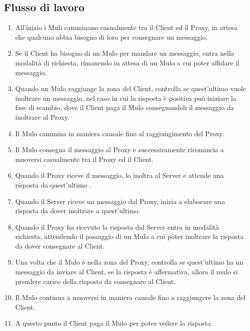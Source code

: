\documentclass[13pt,a4paper]{article}
\begin{document}
\subsection{Flusso di lavoro}
	\begin{enumerate}
	\item All'inizio i Muli camminano casualmente tra il Client ed il Proxy, in attesa che qualcuno abbia bisogno di loro per consegnare un messaggio.
	
	\item Se il Client ha bisogno di un Mulo per mandare un messaggio, entra nella modalità di richiesta, rimanendo in attesa di un Mulo a cui poter affidare il messaggio.
	
	\item Quando un Mulo raggiunge la zona del Client, controlla se quest'ultimo vuole inoltrare un messaggio, nel caso in cui la risposta è positiva può iniziare la fase di scambio, dove il Client paga il Mulo consegnandoli il messaggio da inoltrare al Proxy.
	
	\item Il Mulo cammina in maniera causale fino al raggiungimento del Proxy.
	
	\item Il Mulo consegna il messaggio al Proxy e successivamente ricomincia a muoversi casualmente tra il Proxy ed il Client.
	
	\item Quando il Proxy riceve il messaggio, lo inoltra al Server e attende una risposta da quest'ultimo .
	
	\item Quando il Server riceve un messaggio dal Proxy, inizia a elaborare una risposta da dover inoltrare a quest'ultimo.
	
	\item Quando il Proxy ha ricevuto la risposta dal Server entra in modalità richiesta, attendendo il passaggio  di un Mulo a cui poter inoltrare la risposta da dover consegnare al Client. 
	
	\item Una volta che il Mulo è nella zona del Proxy, controlla se quest'ultimo ha un messaggio da inviare al Client, se la risposta è affermativa, allora il mulo si prendere carico della risposta da consegnare al Client. 
	
	\item Il Mulo continua a muoversi in maniera causale fino a raggiungere la zona del Client. 
	
	\item A questo punto il Client paga il Mulo per poter vedere la risposta.
	\end{enumerate}
\end{document}
